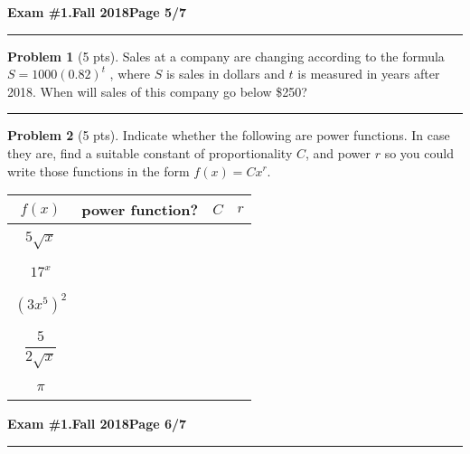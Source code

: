 \documentclass[12pt]{article}
\theoremstyle{definition}
\newtheorem{problem}{Problem}
\begin{document}
\newpage

\hfill{\large\bf Exam \#1.}\hfill{\large\bf  Fall 2018}\hfill{\large\bf Page 5/7}\hrule

\bigskip

\begin{problem}[5 pts]
  Sales at a company are changing according to the formula $S = 1000 (0.82)^t$ , where $S$ is sales in dollars and $t$
  is measured in years after 2018.  When will sales of this company go below \$250?

  \vspace{8cm}
\end{problem}
\hrule

\begin{problem}[5 pts]
  Indicate whether the following are power functions. In case they are, find a suitable constant of proportionality $C$,
  and power $r$ so you could write those functions in the form $f(x) = Cx^r$. 
  \begin{center}
    \begin{tabular}{|c|c|c|c|}
      \hline
      $f(x)$ & power function? & $C$ & $r$ \\
      \hline
      \hline
             &&& \\
      $5\sqrt{x}$ &&\hspace{1cm} & \hspace{1cm} \\
             &&& \\
      \hline
             &&& \\
      $17^x$ &&& \\
             &&& \\
      \hline
             &&& \\
      $(3x^5)^2$ &&& \\
             &&& \\
      \hline
             &&& \\
      $\dfrac{5}{2\sqrt{x}}$ &&& \\
             &&& \\
      \hline
             &&& \\
      $\pi$ &&& \\
             &&& \\
      \hline
    \end{tabular}
  \end{center}
\end{problem}
\newpage

\hfill{\large\bf Exam \#1.}\hfill{\large\bf  Fall 2018}\hfill{\large\bf Page 6/7}\hrule
\end{document}
